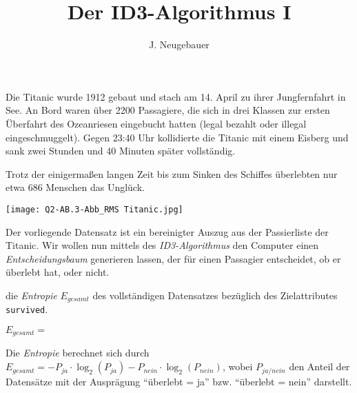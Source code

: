 \documentclass[10pt, a4paper]{scrartcl}
\author{J. Neugebauer}
\title{Der ID3-Algorithmus I}
\date{\Heute}
\begin{document}
\ReiheTitel

\begin{rahmen}\small
	\begin{minipage}{0.69\textwidth}
		Die Titanic wurde 1912 gebaut und stach am 14. April zu ihrer Jungfernfahrt in See. An Bord waren über 2200 Passagiere, die sich in drei Klassen zur ersten Überfahrt des Ozeanriesen eingebucht hatten (legal bezahlt oder illegal eingeschmuggelt). Gegen 23:40 Uhr kollidierte die Titanic mit einem Eisberg und sank zwei Stunden und 40 Minuten später vollständig.
		
		Trotz der einigermaßen langen Zeit bis zum Sinken des Schiffes überlebten nur etwa 686 Menschen das Unglück.
	\end{minipage} \hfill
	\begin{minipage}{0.3\textwidth}
		\begin{center}
			\texttt{[image: Q2-AB.3-Abb\_RMS Titanic.jpg]}
		\end{center}
	\end{minipage}
\end{rahmen}
\bigskip

Der vorliegende Datensatz ist ein bereinigter Auszug aus der Passierliste der Titanic. Wir wollen nun mittels des \emph{ID3-Algorithmus} den Computer einen \emph{Entscheidungsbaum} generieren lassen, der für einen Passagier entscheidet, ob er überlebt hat, oder nicht.

\begin{aufgabe}
	 die \emph{Entropie} $E_{gesamt}$ des vollständigen Datensatzes bezüglich des Zielattributes 
	\texttt{survived}.
	
	\begin{center}
		$E_{gesamt} = $\linie[12cm]
	\end{center}
		
	\begin{infobox}
		Die \emph{Entropie} berechnet sich durch $E_{gesamt} = -P_{ja}\cdot \log_2{(P_{ja})} -P_{nein}\cdot \log_2{(P_{nein})}$, wobei $P_{ja/nein}$ den Anteil der Datensätze mit der Ausprägung \enquote{überlebt = ja} bzw. \enquote{überlebt = nein} darstellt.
	\end{infobox}
\end{aufgabe}
\end{document}

